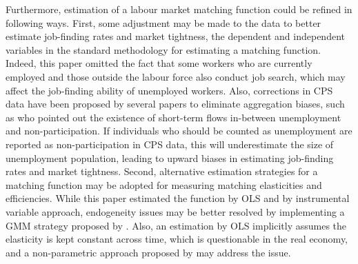 \documentclass[a4paper, 11pt, tikz]{article}
\begin{document}
Furthermore, estimation of a labour market matching function could be refined in following ways.
First, some adjustment may be made to the data to better estimate job-finding rates and market tightness, the dependent and independent variables in the standard methodology for estimating a matching function.
Indeed, this paper omitted the fact that some workers who are currently employed and those outside the labour force also conduct job search, which may affect the job-finding ability of unemployed workers.
Also, corrections in CPS data have been proposed by several papers to eliminate aggregation biases, such as \cite{elsby2015importance} who pointed out the existence of short-term flows in-between unemployment and non-participation.
If individuals who should be counted as unemployment are reported as non-participation in CPS data, this will underestimate the size of unemployment population, leading to upward biases in estimating job-finding rates and market tightness.
Second, alternative estimation strategies for a matching function may be adopted for measuring matching elasticities and efficiencies.
While this paper estimated the function by OLS and by instrumental variable approach, endogeneity issues may be better resolved by implementing a GMM strategy proposed by \cite{borowczyk-martins2013accounting}.
Also, an estimation by OLS implicitly assumes the elasticity is kept constant across time, which is questionable in the real economy, and a non-parametric approach proposed by \cite{lange2020cobbdouglas} may address the issue.


\newpage
\renewcommand*{\refname}{Bibliography}


\end{document}
